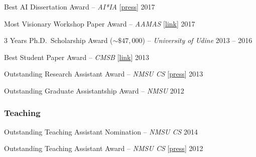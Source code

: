 \item 
	Best AI Dissertation Award -- \emph{AI*IA}
	[\href{https://sites.google.com/a/aixia.it/vincitori-premi/Home}{press}]
	\hfill 2017


\item 
   	Most Visionary Workshop Paper Award -- \emph{AAMAS} 
   	[\href{https://link.springer.com/book/10.1007/978-3-319-71679-4}{link}]
   	\hfill 2017

\item 
	3 Years Ph.D.~Scholarship Award ($\sim \$ 47,000$)	-- \emph{University of Udine} 
	\hfill 2013 -- 2016

\item Best Student Paper Award -- \emph{CMSB} 
		[\href{https://www2.ist.ac.at/cmsb13/program/}{link}]
	\hfill 2013

\item 
	Outstanding Research Assistant Award -- {\em NMSU CS}
	[\href{https://www.cs.nmsu.edu/wp/research/awards/}{press}]
	\hfill 2013
	
\item Outstanding Graduate Assistantship Award -- \emph{NMSU}  
	\hfill 2012
\endList

\subsubsection*{\sc Teaching}
\beginList
   \item  Outstanding Teaching Assistant Nomination -- \emph{NMSU CS} 
   \hfill {2014}

   \item {Outstanding Teaching Assistant Award} -- \emph{NMSU CS}
   	[\href{https://www.cs.nmsu.edu/wp/research/awards/}{press}]
	\hfill {2012}
\endList


